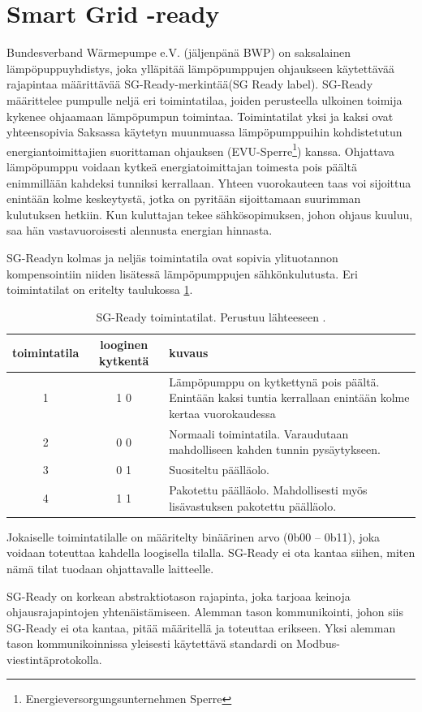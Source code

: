 \section{Smart Grid -ready}

  Bundesverband Wärmepumpe e.V. (jäljenpänä BWP) on saksalainen lämpöpuppuyhdistys, joka ylläpitää lämpöpumppujen ohjaukseen käytettävää rajapintaa määrittävää \gls{SG}-Ready-merkintää(\gls{SG} Ready label). \gls{SG}-Ready määrittelee pumpulle neljä eri toimintatilaa, joiden perusteella ulkoinen toimija kykenee ohjaamaan lämpöpumpun toimintaa. Toimintatilat yksi ja kaksi ovat yhteensopivia Saksassa käytetyn muunmuassa lämpöpumppuihin kohdistetutun energiantoimittajien suorittaman ohjauksen (EVU-Sperre\footnote{Energieversorgungsunternehmen Sperre}) kanssa.\parencite{SGReadyReg} Ohjattava lämpöpumppu voidaan kytkeä energiatoimittajan toimesta pois päältä enimmillään kahdeksi tunniksi kerrallaan. Yhteen vuorokauteen taas voi sijoittua enintään kolme keskeytystä, jotka on pyritään sijoittamaan suurimman kulutuksen hetkiin. Kun kuluttajan tekee sähkösopimuksen, johon ohjaus kuuluu, saa hän vastavuoroisesti alennusta energian hinnasta.\parencite{enwg, VDEARN4100}

  SG-Readyn  kolmas ja neljäs toimintatila ovat sopivia ylituotannon kompensointiin niiden lisätessä lämpöpumppujen sähkönkulutusta. Eri toimintatilat on eritelty taulukossa \ref{sgready}.
  \begin{table}[h]
    \centering
    \caption[\gls{SG}-Ready toimintatilat]{\gls{SG}-Ready toimintatilat. Perustuu lähteeseen \parencite{SGReadyReg}.}
    \begin{tabular}{|c|c|p{3in}|}
      \hline
      \rowcolor{lightgray} toimintatila & looginen kytkentä & kuvaus \\\hline
      1 & 1 0 & Lämpöpumppu on kytkettynä pois päältä. Enintään kaksi tuntia kerrallaan enintään kolme kertaa vuorokaudessa \\\hline
      2 & 0 0 & Normaali toimintatila. Varaudutaan mahdolliseen kahden tunnin pysäytykseen. \\\hline
      3 & 0 1 & Suositeltu päälläolo. \\ \hline
      4 & 1 1 & Pakotettu päälläolo. Mahdollisesti myös lisävastuksen pakotettu päälläolo. \\\hline
    \end{tabular}
    \label{sgready}
  \end{table}
  Jokaiselle toimintatilalle on määritelty binäärinen arvo (0b00 -- 0b11), joka voidaan toteuttaa kahdella loogisella tilalla. SG-Ready ei ota kantaa siihen, miten nämä tilat tuodaan ohjattavalle laitteelle.\parencite{SGReadyReg}

  SG-Ready on korkean abstraktiotason rajapinta, joka tarjoaa keinoja ohjausrajapintojen yhtenäistämiseen. Alemman tason kommunikointi, johon siis SG-Ready ei ota kantaa, pitää määritellä ja toteuttaa erikseen. Yksi alemman tason kommunikoinnissa yleisesti käytettävä standardi on Modbus-viestintäprotokolla.
